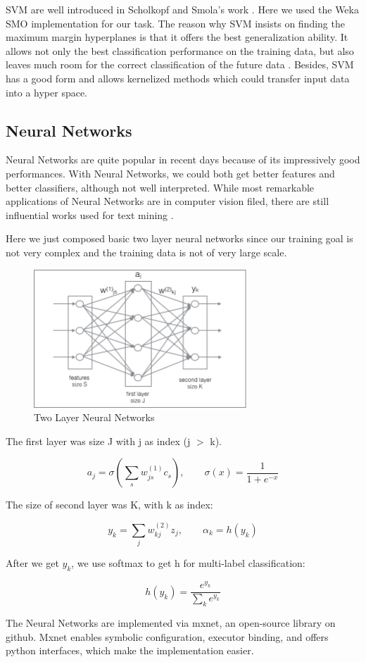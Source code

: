 SVM are well introduced in Scholkopf and Smola's work \cite{scholkopf2002learning}.
Here we used the Weka SMO implementation for our task. The reason why SVM
insists on finding the maximum margin hyperplanes is that it offers the best
generalization ability. It allows not only the best classification performance
on the training data, but also leaves much room for the correct classification
of the future data \cite{wu2008top}. Besides, SVM has a good form and allows
kernelized methods which could transfer input data into a hyper space.


\subsection{Neural Networks}
Neural Networks are quite popular in recent days because of its impressively
good performances. With Neural Networks, we could both get better features and
better classifiers, although not well interpreted. While most remarkable
applications of Neural Networks are in computer vision filed, there are still
influential works used for text mining \cite{hochreiter1997long}
\cite{bengio2003neural}.

Here we just composed basic two layer neural networks since our training goal is
not very complex and the training data is not of very large scale.

\begin{figure}[!htbp]
    \centering
    \includegraphics[width=8cm]{./pic/NN.png}
    \caption{Two Layer Neural Networks}
\end{figure}

The first layer was size J with j as index (j $>$ k).

\begin{equation}
a_{j} = \sigma (\sum_s w_{js}^{(1)} c_{s}), \qquad
\sigma (x) = \frac{1}{1 + e^{-x}}
\end{equation}

The size of second layer was K, with k as index:

\begin{equation}
y_k = \sum_j w_{kj}^{(2)} z_{j}, \qquad
\alpha_k = h(y_k)
\end{equation}

After we get $y_{k}$, we use softmax to get h for multi-label classification:

\begin{equation}
h(y_k) = \frac{e^{y_{k}}}{\sum_{k} e^{y_{k}}}
\end{equation}

The Neural Networks are implemented via mxnet, an open-source library on github.
Mxnet enables symbolic configuration, executor binding, and offers python interfaces,
which make the implementation easier.

